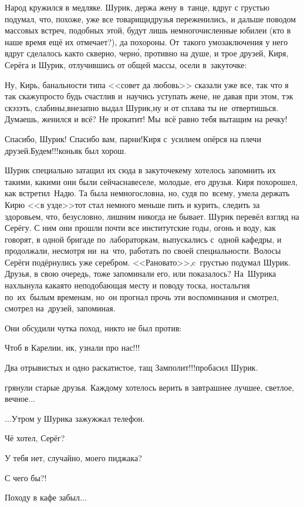 {%
Народ кружился в медляке. Шурик, держа жену в~танце, вдруг с грустью подумал, что, похоже, уже все товарищи\sdash друзья переженились, и дальше поводом массовых встреч, подобных этой, будут лишь немногочисленные юбилеи (кто в наше время ещё их отмечает?), да похороны. От~такого умозаключения у него вдруг сделалось как\sdash то скверно, черн\'{о}, противно на душе, и трое друзей, Киря, Серёга и Шурик, отлучившись от общей массы, осели в~закуточке:

\diagdash Ну, Кирь, банальности типа <<совет да любовь>> сказали уже все, так что я так скажу\mdash просто будь счастлив и~научись уступать жене, не давая при этом, тэк скэзэть, слабины,\mdash внезапно выдал Шурик,\mdash ну и от сплава ты не~отвертишься. Думаешь, женился и всё? Не прокатит! Мы~всё равно тебя вытащим на речку!

\diagdash Спасибо, Шурик! Спасибо вам, парни!\mdash Киря с~усилием опёрся на плечи друзей.\mdash Будем!!!\mdash коньяк был хорош.

Шурик специально затащил их сюда в закуточек\mdash ему хотелось запомнить их такими, какими они были сейчас\mdash навеселе, молодые, его друзья. Киря похорошел, как встретил~Надю. Та была немногословна, но, судя по~всему, умела держать Кирю <<в узде>>\mdash тот стал немного меньше пить и курить, следить за здоровьем, что, безусловно, лишним никогда не бывает. Шурик перевёл взгляд на Серёгу. С ним они прошли почти все институтские годы, огонь и воду, как говорят, в одной бригаде по~лабораторкам, выпускались с~одной кафедры, и продолжали, несмотря ни~на~что, работать по своей специальности. Волосы Серёги подёрнулись уже серебром. <<Рановато>>,\mdash c~грустью подумал Шурик. Друзья, в свою очередь, тоже запоминали его, или показалось? На~Шурика нахлынула какая\sdash то неподобающая месту и поводу тоска, ностальгия по~их~былым временам, но~он прогнал прочь эти воспоминания и смотрел, смотрел на~друзей, запоминая.  

Они обсудили чутка поход, никто не был против:

\diagdash Чтоб в Карелии, ик, узнали про нас!!!%

\diagdash Два отрывистых и одно раскатистое, тащ Замполит!!!\mdash пробасил Шурик.

\mdash грянули старые друзья. Каждому хотелось верить в завтрашнее лучшее, светлое, вечное$\ldots$

\vspace{0.5cm}
$\ldots$Утром у Шурика зажужжал телефон. 

\diagdash Чё хотел, Серёг?

\diagdash У тебя нет, случайно, моего пиджака?

\diagdash С чего бы?!

\diagdash Походу в кафе забыл$\ldots$

\begin{center}
\end{center}
}